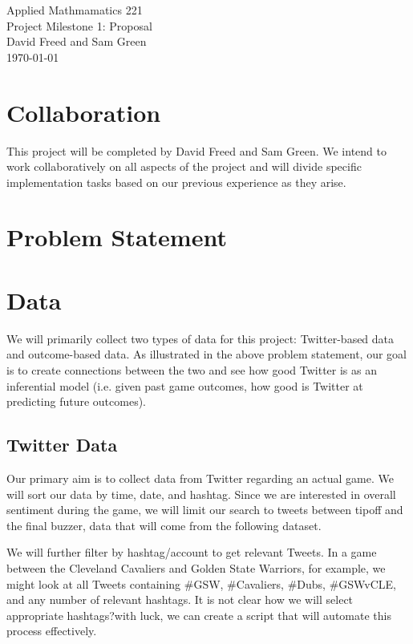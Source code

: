 \documentclass[12pt]{article}
\begin{document}
\begin{center}
{\Large Applied Mathmamatics 221}\\
Project Milestone 1: Proposal\\
David Freed and Sam Green\\
\today
\end{center}

\section{Collaboration}

This project will be completed by David Freed and Sam Green. We intend to work collaboratively on all aspects of the project and will divide specific implementation tasks based on our previous experience as they arise.

\section{Problem Statement}



\section{Data}

We will primarily collect two types of data for this project: Twitter-based data and outcome-based data. As illustrated in the above problem statement, our goal is to create connections between the two and see how good Twitter is as an inferential model (i.e. given past game outcomes, how good is Twitter at predicting future outcomes). 

\subsection{Twitter Data}

Our primary aim is to collect data from Twitter regarding an actual game. We will sort our data by time, date, and hashtag. Since we are interested in overall sentiment during the game, we will limit our search to tweets between tipoff and the final buzzer, data that will come from the following dataset. 

We will further filter by hashtag/account to get relevant Tweets. In a game between the Cleveland Cavaliers and Golden State Warriors, for example, we might look at all Tweets containing \#GSW, \#Cavaliers, \#Dubs, \#GSWvCLE, and any number of relevant hashtags. It is not clear how we will select appropriate hashtags?with luck, we can create a script that will automate this process effectively. 
\end{document}
